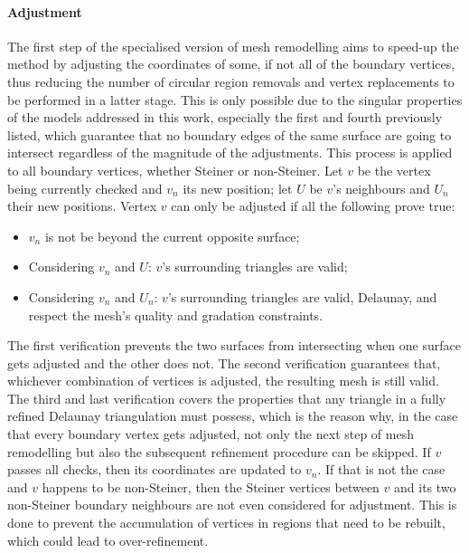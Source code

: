 \paragraph{Adjustment} The first step of the specialised version of mesh remodelling aims to speed-up the method by adjusting the coordinates of some, if not all of the boundary vertices, thus reducing the number of circular region removals and vertex replacements to be performed in a latter stage. This is only possible due to the singular properties of the models addressed in this work, especially the first and fourth previously listed, which guarantee that no boundary edges of the same surface are going to intersect regardless of the magnitude of the adjustments. This process is applied to all boundary vertices, whether Steiner or non-Steiner. Let $v$ be the vertex being currently checked and $v_n$ its new position; let $U$ be $v$'s neighbours and $U_n$ their new positions. Vertex $v$ can only be adjusted if all the following prove true:
\begin{itemize}
\item $v_n$ is not be beyond the current opposite surface;
\item Considering $v_n$ and $U$: $v$'s surrounding triangles are valid;
\item Considering $v_n$ and $U_n$: $v$'s surrounding triangles are valid, Delaunay, and respect the mesh's quality and gradation constraints.
\end{itemize}
The first verification prevents the two surfaces from intersecting when one surface gets adjusted and the other does not. The second verification guarantees that, whichever combination of vertices is adjusted, the resulting mesh is still valid. The third and last verification covers the properties that any triangle in a fully refined Delaunay triangulation must possess, which is the reason why, in the case that every boundary vertex gets adjusted, not only the next step of mesh remodelling but also the subsequent refinement procedure can be skipped. If $v$ passes all checks, then its coordinates are updated to $v_n$. If that is not the case and $v$ happens to be non-Steiner, then the Steiner vertices between $v$ and its two non-Steiner boundary neighbours are not even considered for adjustment. This is done to prevent the accumulation of vertices in regions that need to be rebuilt, which could lead to over-refinement.

